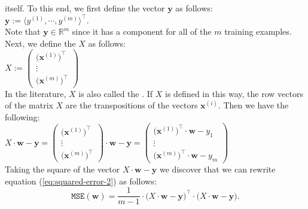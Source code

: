 itself.  To this end, we first define the vector $\mathbf{y}$ as follows:
\\[0.2cm]
\hspace*{1.3cm}
$\mathbf{y} := \langle y^{(1)}, \cdots, y^{(m)} \rangle^\top$.
\\[0.2cm]
Note that $\mathbf{y} \in \mathbb{R}^m$ since it has a component for all of the $m$ training
examples.  Next, we define the   $X$ as follows:
\\[0.2cm]
\hspace*{1.3cm}
$X := \left(
  \begin{array}{c}
    \bigl(\mathbf{x}^{(1)}\bigr)^\top  \\
    \vdots                         \\
    \bigl(\mathbf{x}^{(m)}\bigr)^\top
  \end{array}
  \right)   
$
\\[0.2cm]
In the literature, $X$ is also called the . 
If $X$ is defined in this way, the row vectors of the matrix $X$ are the transpositions of the vectors $\mathbf{x}^{(i)}$.
Then we have the following:
\\[0.2cm]
\hspace*{1.3cm}
$X \cdot \mathbf{w} - \mathbf{y} = \left(
  \begin{array}{c}
    \bigl(\mathbf{x}^{(1)}\bigr)^\top  \\
    \vdots                         \\
    \bigl(\mathbf{x}^{(m)}\bigr)^\top
  \end{array}
  \right) \cdot \mathbf{w} - \mathbf{y} = \left(
  \begin{array}{c}
    \bigl(\mathbf{x}^{(1)}\bigr)^\top \cdot \mathbf{w} - y_1 \\
    \vdots                         \\
    \bigl(\mathbf{x}^{(m)}\bigr)^\top \cdot \mathbf{w} - y_m
  \end{array}
  \right)
$
\\[0.2cm]
Taking the square of the vector $X \cdot \mathbf{w} - \mathbf{y}$ we discover that
we can rewrite equation (\ref{eq:squared-error-2}) as follows:
\begin{equation}
  \label{eq:squared-error-3}
  \mathtt{MSE}(\mathbf{w}) = \frac{1}{m-1} \cdot \bigl(X \cdot \mathbf{w} - \textbf{y}\bigr)^\top \cdot 
                                            \bigl(X \cdot \mathbf{w} - \textbf{y}\bigr).
\end{equation}

